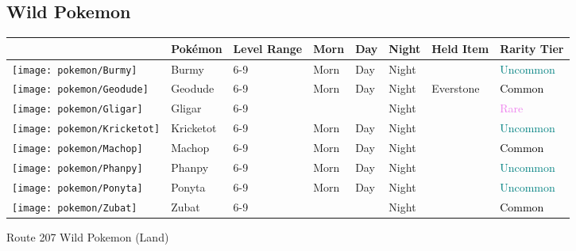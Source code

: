 \subsection{Wild Pokemon}%
\label{subsec:WildPokemon}%
\begin{longtable}{||l l l l l l l l||}%
\hline%
&Pokémon&Level Range&Morn&Day&Night&Held Item&Rarity Tier\\%
\hline%
\endhead%
\hline%
\texttt{[image: pokemon/Burmy]}&Burmy&6{-}9&Morn&Day&Night&&\textcolor{teal}{%
Uncommon%
}\\%
\hline%
\texttt{[image: pokemon/Geodude]}&Geodude&6{-}9&Morn&Day&Night&Everstone&\textcolor{black}{%
Common%
}\\%
\hline%
\texttt{[image: pokemon/Gligar]}&Gligar&6{-}9&&&Night&&\textcolor{violet}{%
Rare%
}\\%
\hline%
\texttt{[image: pokemon/Kricketot]}&Kricketot&6{-}9&Morn&Day&Night&&\textcolor{teal}{%
Uncommon%
}\\%
\hline%
\texttt{[image: pokemon/Machop]}&Machop&6{-}9&Morn&Day&Night&&\textcolor{black}{%
Common%
}\\%
\hline%
\texttt{[image: pokemon/Phanpy]}&Phanpy&6{-}9&Morn&Day&Night&&\textcolor{teal}{%
Uncommon%
}\\%
\hline%
\texttt{[image: pokemon/Ponyta]}&Ponyta&6{-}9&Morn&Day&Night&&\textcolor{teal}{%
Uncommon%
}\\%
\hline%
\texttt{[image: pokemon/Zubat]}&Zubat&6{-}9&&&Night&&\textcolor{black}{%
Common%
}\\%
\hline%
\end{longtable}%
\caption{Route 207 Wild Pokemon (Land)}
